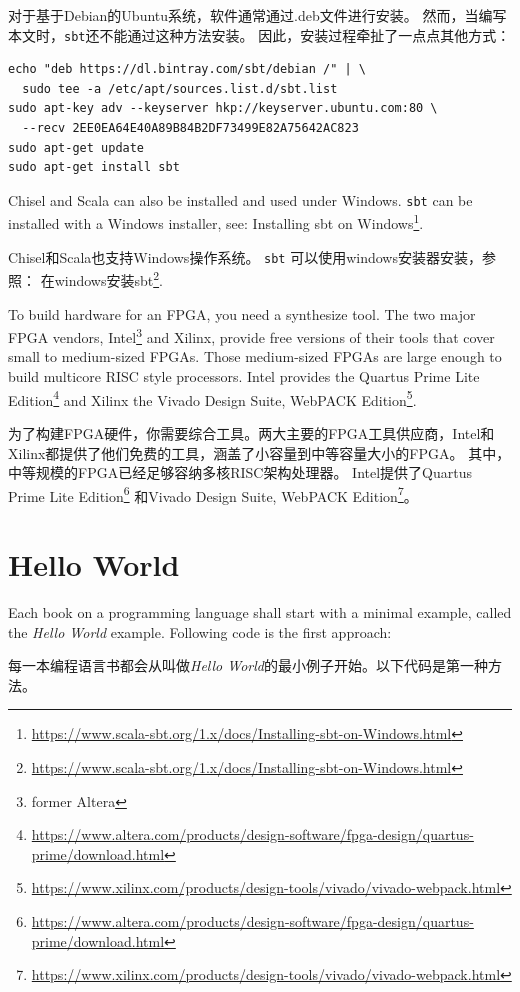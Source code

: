 \documentclass[%
    10pt,
    headinclude, footexclude,
    openright, %
    notitlepage,
    cleardoubleempty,
    headsepline,
    pointlessnumbers,
    bibtotoc, idxtotoc,
    ]{scrbook}
\newcommand{\code}[1]{{\small{\texttt{#1}}}}
\newcommand{\myref}[2]{\href{#1}{#2}}
\renewcommand{\myref}[2]{{#2}{\footnote{\url{#1}}}}
\begin{document}
对于基于Debian的Ubuntu系统，软件通常通过.deb文件进行安装。
然而，当编写本文时，\code{sbt}还不能通过这种方法安装。
因此，安装过程牵扯了一点点其他方式：

\begin{verbatim}
echo "deb https://dl.bintray.com/sbt/debian /" | \
  sudo tee -a /etc/apt/sources.list.d/sbt.list
sudo apt-key adv --keyserver hkp://keyserver.ubuntu.com:80 \
  --recv 2EE0EA64E40A89B84B2DF73499E82A75642AC823
sudo apt-get update
sudo apt-get install sbt
\end{verbatim}

Chisel and Scala can also be installed and used under Windows.
\code{sbt} can be installed with a Windows installer, see:
\myref{https://www.scala-sbt.org/1.x/docs/Installing-sbt-on-Windows.html}{Installing sbt on Windows}.

Chisel和Scala也支持Windows操作系统。
\code{sbt} 可以使用windows安装器安装，参照：
\myref{https://www.scala-sbt.org/1.x/docs/Installing-sbt-on-Windows.html}{在windows安装sbt}.

To build hardware for an FPGA, you need a synthesize tool. The two major
FPGA vendors, Intel\footnote{former Altera} and Xilinx, provide free versions of
their tools that cover small to medium-sized FPGAs. Those medium-sized
FPGAs are large enough to build multicore RISC style processors.
Intel provides the \myref{https://www.altera.com/products/design-software/fpga-design/quartus-prime/download.html}{Quartus Prime Lite Edition} and Xilinx the
\myref{https://www.xilinx.com/products/design-tools/vivado/vivado-webpack.html}{Vivado Design Suite, WebPACK Edition}.

为了构建FPGA硬件，你需要综合工具。两大主要的FPGA工具供应商，Intel和Xilinx都提供了他们免费的工具，涵盖了小容量到中等容量大小的FPGA。
其中，中等规模的FPGA已经足够容纳多核RISC架构处理器。
Intel提供了\myref{https://www.altera.com/products/design-software/fpga-design/quartus-prime/download.html}{Quartus Prime Lite Edition} 
和\myref{https://www.xilinx.com/products/design-tools/vivado/vivado-webpack.html}{Vivado Design Suite, WebPACK Edition}。


\section{Hello World}

Each book on a programming language shall start with a minimal example,
called the \emph{Hello World} example. Following code is the first approach:

每一本编程语言书都会从叫做\emph{Hello World}的最小例子开始。以下代码是第一种方法。
\end{document}
